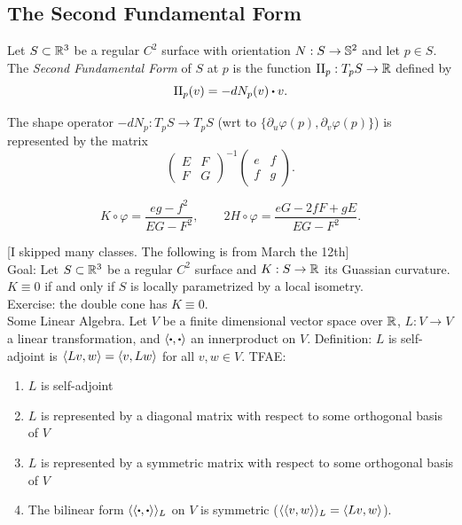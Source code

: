 \subsection{The Second Fundamental Form}

\begin{definition}
    Let $S \subset \R^3$ be a regular $C^2$ surface with orientation $N : S \to \S^2$ and let $p \in S$. The \textit{Second Fundamental Form} of $S$ at $p$ is the function $\text{II}_p : T_p S \to \R$ defined by
    $$\text{II}_p(v) = -dN_p(v) \bigcdot v.$$
\end{definition}

\begin{proposition}
    The shape operator $-dN_p : T_p S\to T_pS$ (wrt to $\{\partial_u \varphi(p), \partial_v \varphi(p)\}$) is represented by the matrix
    $$\begin{pmatrix} E & F \\ F & G \end{pmatrix}^{-1}\begin{pmatrix} e & f \\ f & g \end{pmatrix}.$$
\end{proposition}

\begin{corollary}
    $$K \circ \varphi = \frac{eg - f^2}{EG - F^2}, \qquad 2H \circ \varphi = \frac{eG - 2fF + gE}{EG - F^2}.$$
\end{corollary}

\td \td \td 

[I skipped many classes. The following is from March the 12th]\\

Goal: Let $S \subset \R^3$ be a regular $C^2$ surface and $K : S \to \R$ its Guassian curvature. $K \equiv 0$ if and only if $S$ is locally parametrized by a local isometry.\\

Exercise: the double cone has $K \equiv 0$. \td \\

Some Linear Algebra. Let $V$ be a finite dimensional vector space over $\R$, $L : V \to V$ a linear transformation, and $\inner{\bigcdot}{\bigcdot}$ an innerproduct on $V$. Definition: $L$ is self-adjoint is $\inner{Lv}{w} = \inner{v}{Lw}$ for all $v,w \in V$. TFAE:
\begin{enumerate}
    \item $L$ is self-adjoint 
    \item $L$ is represented by a diagonal matrix with respect to some orthogonal basis of $V$
    \item $L$ is represented by a symmetric matrix with respect to some orthogonal basis of $V$
    \item The bilinear form $\langle \inner{\bigcdot}{\bigcdot} \rangle_L$ on $V$ is symmetric ($\langle \inner{v}{w} \rangle_L = \inner{Lv}{w}$).
\end{enumerate}

